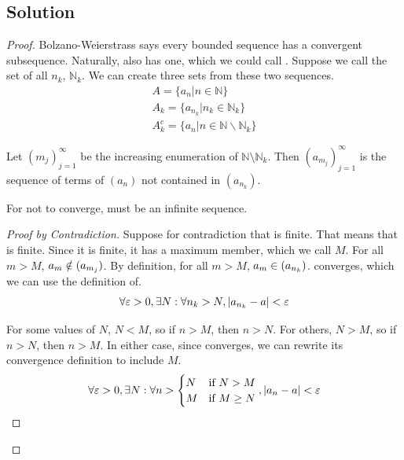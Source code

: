 \documentclass[12pt]{report}
\begin{document}
    \subsection{Solution}
        \begin{proof}
            Bolzano-Weierstrass says every bounded sequence has a convergent subsequence.
            Naturally,  also has one, which we could call .
            Suppose we call the set of all $n_k$, $\mathbb{N}_k$.
            We can create three sets from these two sequences.
            \begin{gather}
                A = \{a_n | n \in \mathbb{N}\}\\
                A_k = \{a_{n_k} | n_k \in \mathbb{N}_k\}\\
                A_k^c = \{a_n | n \in \mathbb{N} \backslash \mathbb{N}_k\}
            \end{gather}

            Let $(m_j)_{j=1}^\infty$ be the increasing enumeration of $\mathbb N \setminus \mathbb N_k$.
            Then $(a_{m_j})_{j=1}^\infty$ is the sequence of terms of $(a_n)$ not contained in $(a_{n_k})$.

            For  not to converge,  must be an infinite sequence.
            \begin{proof}[Proof by Contradiction]
                Suppose for contradiction that  is finite.
                That means that  is finite.
                Since it is finite, it has a maximum member, which we call $M$.
                For all $m > M$, $a_m \notin \seq[m_j]{a}$.
                By definition, for all $m > M$, $a_m \in \seq[n_k]{a}$.
                 converges, which we can use the definition of.
                \begin{equation}
                    \forall \varepsilon > 0, \exists N : \forall n_k > N, \abs{a_{n_k} - a} < \varepsilon
                \end{equation}

                For some values of $N$, $N < M$, so if $n > M$, then $n > N$.
                For others, $N > M$, so if $n > N$, then $n > M$.
                In either case, since  converges, we can rewrite its convergence definition to include $M$.
                \begin{equation}
                    \forall \varepsilon > 0, \exists N : \forall n > \begin{cases} N & \mathif N > M\\ M & \mathif M \geq N \end{cases}, \abs{a_n - a} < \varepsilon
                \end{equation}


\end{proof}
\end{proof}
\end{document}
